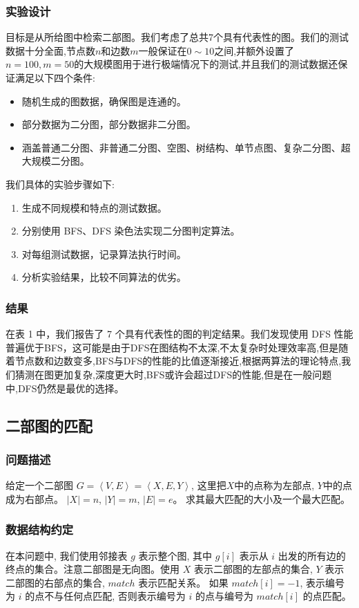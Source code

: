 \subsubsection{\textbf{\mbox{实验设计}}}
目标是从所给图中检索二部图。我们考虑了总共7个具有代表性的图。我们的测试数据十分全面,节点数$n$和边数$m$一般保证在$0\sim10$之间,并额外设置了$n=100,m=50$的大规模图用于进行极端情况下的测试,并且我们的测试数据还保证满足以下四个条件:
\begin{itemize}
	\item 随机生成的图数据，确保图是连通的。
	\item 部分数据为二分图，部分数据非二分图。
	\item 涵盖普通二分图、非普通二分图、空图、树结构、单节点图、复杂二分图、超大规模二分图。
\end{itemize}
我们具体的实验步骤如下:
\begin{enumerate}
	\item 生成不同规模和特点的测试数据。
	\item 分别使用 BFS、DFS 染色法实现二分图判定算法。
	\item 对每组测试数据，记录算法执行时间。
	\item 分析实验结果，比较不同算法的优劣。
\end{enumerate}

\subsubsection{\textbf{\mbox{结果}}}
在表 1 中，我们报告了 7 个具有代表性的图的判定结果。我们发现使用 DFS 性能普遍优于BFS，这可能是由于DFS在图结构不太深,不太复杂时处理效率高,但是随着节点数和边数变多,BFS与DFS的性能的比值逐渐接近,根据两算法的理论特点,我们猜测在图更加复杂,深度更大时,BFS或许会超过DFS的性能,但是在一般问题中,DFS仍然是最优的选择。

\subsection{\textbf{\mbox{二部图的匹配}}}
\subsubsection{问题描述}
给定一个二部图 $G = \left<V, E\right> = \left<X, E, Y\right>$, 这里把$X$中的点称为左部点, $Y$中的点成为右部点。 $\left|X\right| = n$, $\left|Y\right| = m$, $\left|E\right| = e$。 求其最大匹配的大小及一个最大匹配。
\subsubsection{数据结构约定}
在本问题中, 我们使用邻接表 $g$ 表示整个图, 其中 $g[i]$ 表示从 $i$ 出发的所有边的终点的集合。注意二部图是无向图。使用 $X$ 表示二部图的左部点的集合, $Y$ 表示二部图的右部点的集合, $match$ 表示匹配关系。
如果 $match[i] = -1$, 表示编号为 $i$ 的点不与任何点匹配, 否则表示编号为 $i$ 的点与编号为 $match[i]$ 的点匹配。

